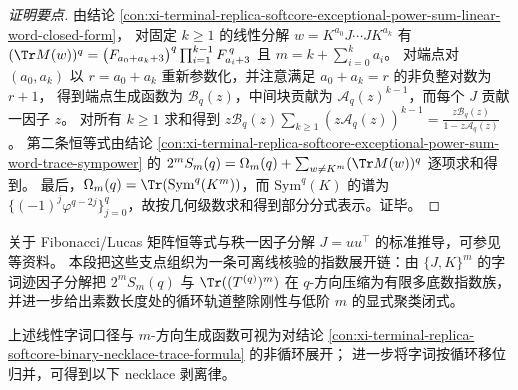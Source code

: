 \begin{proof}[证明要点]
由结论 \ref{con:xi-terminal-replica-softcore-exceptional-power-sum-linear-word-closed-form}，
对固定 \(k\ge 1\) 的线性分解 \(w=K^{a_0}J\cdots JK^{a_k}\) 有
\(
(\Tr M(w))^q=\bigl(F_{a_0+a_k+3}\bigr)^q\prod_{i=1}^{k-1}F_{a_i+3}^{\,q}
\)
且 \(m=k+\sum_{i=0}^{k}a_i\)。
对端点对 \((a_0,a_k)\) 以 \(r=a_0+a_k\) 重新参数化，并注意满足 \(a_0+a_k=r\) 的非负整对数为 \(r+1\)，
得到端点生成函数为 \(\mathscr B_q(z)\)，中间块贡献为 \(\mathscr A_q(z)^{k-1}\)，而每个 \(J\) 贡献一因子 \(z\)。
对所有 \(k\ge 1\) 求和得到
\(
z\mathscr B_q(z)\sum_{k\ge 1}(z\mathscr A_q(z))^{k-1}=\frac{z\mathscr B_q(z)}{1-z\mathscr A_q(z)}
\)。
第二条恒等式由结论 \ref{con:xi-terminal-replica-softcore-exceptional-power-sum-word-trace-sympower} 的
\(2^mS_m(q)=\Omega_m(q)+\sum_{w\neq K^m}(\Tr M(w))^q\) 逐项求和得到。
最后，\(\Omega_m(q)=\Tr(\mathrm{Sym}^q(K^m))\)，而 \(\mathrm{Sym}^q(K)\) 的谱为
\(\{(-1)^j\varphi^{q-2j}\}_{j=0}^{q}\)，故按几何级数求和得到部分分式表示。证毕。
\end{proof}
\begin{remark}[文献对照]\label{rem:xi-terminal-replica-softcore-word-trace-literature-contrast}
关于 Fibonacci/Lucas 矩阵恒等式与秩一因子分解 \(J=uu^{\top}\) 的标准推导，可参见 \cite{FQFibonacciLucasChap11Matrices,MSEFibonacciMatrices784710} 等资料。
本段把这些支点组织为一条可离线核验的指数展开链：由 \(\{J,K\}^m\) 的字词迹因子分解把 \(2^mS_m(q)\) 与 \(\Tr((T^{(q)})^m)\) 在 \(q\)-方向压缩为有限多底数指数族，并进一步给出素数长度处的循环轨道整除刚性与低阶 \(m\) 的显式聚类闭式。
\end{remark}
上述线性字词口径与 \(m\)-方向生成函数可视为对结论 \ref{con:xi-terminal-replica-softcore-binary-necklace-trace-formula} 的非循环展开；
进一步将字词按循环移位归并，可得到以下 necklace 剥离律。
\endinput
